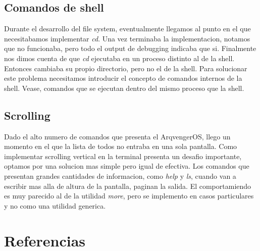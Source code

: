 \documentclass[a4paper,10pt]{article}
\begin{document}
\subsection{Comandos de shell}
Durante el desarrollo del file system, eventualmente llegamos al punto en el que necesitabamos implementar \textit{cd}.
Una vez terminaba la implementacion, notamos que no funcionaba, pero todo el output de debugging indicaba que si.
Finalmente nos dimos cuenta de que \textit{cd} ejecutaba en un proceso distinto al de la shell.
Entonces cambiaba su propio directorio, pero no el de la shell.
Para solucionar este problema necesitamos introducir el concepto de comandos internos de la shell.
Vease, comandos que se ejecutan dentro del mismo proceso que la shell.

\subsection{Scrolling}
Dado el alto numero de comandos que presenta el ArqvengerOS, llego un momento en el que la lista de todos no entraba en una sola pantalla.
Como implementar scrolling vertical en la terminal presenta un desafio importante, optamos por una solucion mas simple pero igual de efectiva.
Los comandos que presentan grandes cantidades de informacion, como \textit{help} y \textit{ls}, cuando van a escribir mas alla de altura de la pantalla, paginan la salida.
El comportamiendo es muy parecido al de la utilidad \textit{more}, pero se implemento en casos particulares y no como una utilidad generica.

\newpage     
\section{Referencias}
\end{document}
